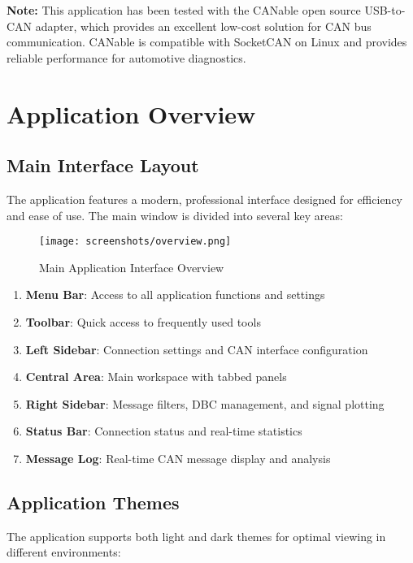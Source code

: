 \documentclass[11pt,a4paper]{article}
\begin{document}
\textbf{Note:} This application has been tested with the CANable open source USB-to-CAN adapter, which provides an excellent low-cost solution for CAN bus communication. CANable is compatible with SocketCAN on Linux and provides reliable performance for automotive diagnostics.

\section{Application Overview}

\subsection{Main Interface Layout}

The application features a modern, professional interface designed for efficiency and ease of use. The main window is divided into several key areas:

\begin{figure}[H]
    \centering
    \texttt{[image: screenshots/overview.png]}
    \caption{Main Application Interface Overview}
    \label{fig:overview}
\end{figure}

\begin{enumerate}
    \item \textbf{Menu Bar}: Access to all application functions and settings
    \item \textbf{Toolbar}: Quick access to frequently used tools
    \item \textbf{Left Sidebar}: Connection settings and CAN interface configuration
    \item \textbf{Central Area}: Main workspace with tabbed panels
    \item \textbf{Right Sidebar}: Message filters, DBC management, and signal plotting
    \item \textbf{Status Bar}: Connection status and real-time statistics
    \item \textbf{Message Log}: Real-time CAN message display and analysis
\end{enumerate}

\subsection{Application Themes}

The application supports both light and dark themes for optimal viewing in different environments:
\end{document}

